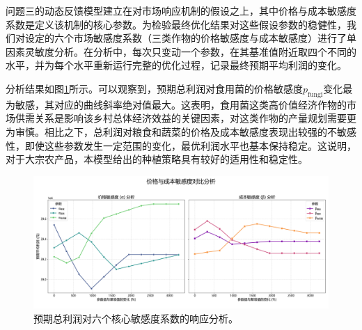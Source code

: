 问题三的动态反馈模型建立在对市场响应机制的假设之上，其中价格与成本敏感度系数是定义该机制的核心参数。为检验最终优化结果对这些假设参数的稳健性，我们对设定的六个市场敏感度系数（三类作物的价格敏感度与成本敏感度）进行了单因素灵敏度分析。在分析中，每次只变动一个参数，在其基准值附近取四个不同的水平，并为每个水平重新运行完整的优化过程，记录最终预期平均利润的变化。

分析结果如图\ref{fig:market_sensitivity}所示。可以观察到，预期总利润对食用菌的价格敏感度$p_{\text{fungi}}$变化最为敏感，其对应的曲线斜率绝对值最大。这表明，食用菌这类高价值经济作物的市场供需关系是影响该乡村总体经济效益的关键因素，对这类作物的产量规划需要更为审慎。相比之下，总利润对粮食和蔬菜的价格及成本敏感度表现出较强的不敏感性，即使这些参数发生一定范围的变化，最优利润水平也基本保持稳定。这说明，对于大宗农产品，本模型给出的种植策略具有较好的适用性和稳定性。

\begin{figure}[H]
    \centering
    \includegraphics[width=\textwidth]{figs/6灵敏度分析/问题三灵敏度分析图.png}
    \caption{预期总利润对六个核心敏感度系数的响应分析。}
    \label{fig:market_sensitivity}
\end{figure}
